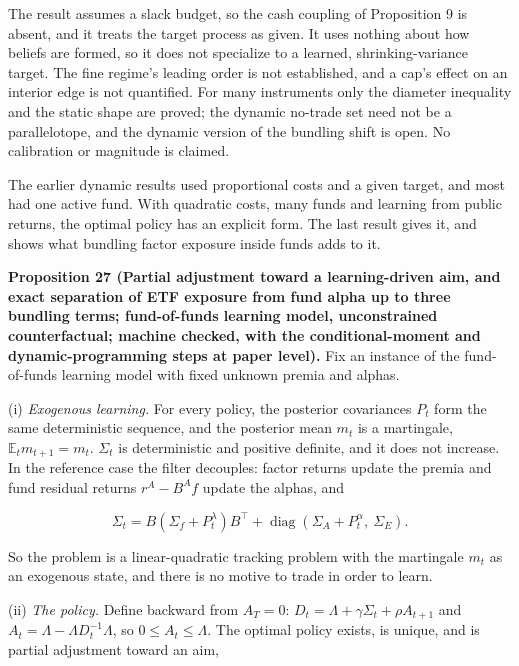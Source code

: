 \documentclass[11pt]{article}
\begin{document}
The result assumes a slack budget, so the cash coupling of Proposition
9 is absent, and it treats the target process as given. It uses
nothing about how beliefs are formed, so it does not specialize to a
learned, shrinking-variance target. The fine regime's leading order is
not established, and a cap's effect on an interior edge is not
quantified. For many instruments only the diameter inequality and the
static shape are proved; the dynamic no-trade set need not be a
parallelotope, and the dynamic version of the bundling shift is open.
No calibration or magnitude is claimed.

The earlier dynamic results used proportional costs and a given
target, and most had one active fund. With quadratic costs, many
funds and learning from public returns, the optimal policy has an
explicit form. The last result gives it, and
shows what bundling factor exposure inside funds adds to it.

\label{res:Proposition-27}
\textbf{Proposition 27 (Partial adjustment toward a learning-driven aim, and exact separation of ETF exposure from fund alpha up to three bundling terms; fund-of-funds learning model, unconstrained counterfactual; machine checked, with the conditional-moment and dynamic-programming steps at paper level).}
Fix an instance of the fund-of-funds learning model with fixed
unknown premia and alphas.

(i) \emph{Exogenous learning.} For every policy, the posterior covariances
\(P_t\) form the same deterministic sequence, and the posterior mean
\(m_t\) is a martingale, \(\mathbb E_tm_{t+1}=m_t\). \(\Sigma_t\) is
deterministic and positive definite, and it does not increase. In the
reference case the filter decouples: factor returns update the premia
and fund residual returns \(r^A-B^Af\) update the alphas, and

\begin{equation*}
\Sigma_t=B(\Sigma_f+P^\lambda_t)B^\top
 +\operatorname{diag}(\Sigma_A+P^\alpha_t,\ \Sigma_E).\tag{83}\label{eq:83}
\end{equation*}

So the problem is a linear-quadratic tracking problem with the
martingale \(m_t\) as an exogenous state, and there is no motive to
trade in order to learn.

(ii) \emph{The policy.} Define backward from \(A_T=0\):
\(D_t=\Lambda+\gamma\Sigma_t+\rho A_{t+1}\) and
\(A_t=\Lambda-\Lambda D_t^{-1}\Lambda\), so \(0\leq A_t\leq\Lambda\). The optimal
policy exists, is unique, and is partial adjustment toward an aim,
\end{document}
